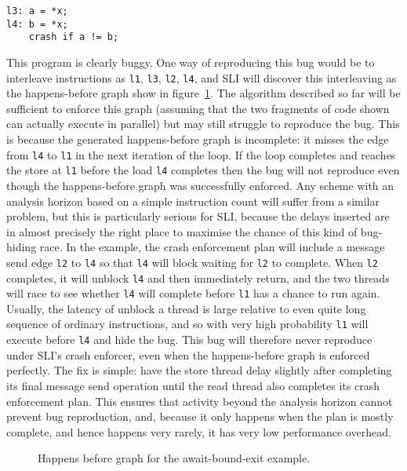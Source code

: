 \begin{verbatim}
l3: a = *x;
l4: b = *x;
    crash if a != b;
\end{verbatim}

This program is clearly buggy.  One way of reproducing this bug would
be to interleave instructions as \verb|l1|, \verb|l3|, \verb|l2|,
\verb|l4|, and SLI will discover this interleaving as the
happens-before graph show in figure~\ref{fig:enforce:await_exit_hb}.
The algorithm described so far will be sufficient to enforce this
graph (assuming that the two fragments of code shown can actually
execute in parallel) but may still struggle to reproduce the bug.
This is because the generated happens-before graph is incomplete: it
misses the edge from \verb|l4| to \verb|l1| in the next iteration of
the loop.  If the loop completes and reaches the store at \verb|l1|
before the load \verb|l4| completes then the bug will not reproduce
even though the happens-before graph was successfully enforced.  Any
scheme with an analysis horizon based on a simple instruction count
will suffer from a similar problem, but this is particularly serious
for SLI, because the delays inserted are in almost precisely the right
place to maximise the chance of this kind of bug-hiding race.  In the
example, the crash enforcement plan will include a message send edge
\verb|l2| to \verb|l4| so that \verb|l4| will block waiting for
\verb|l2| to complete.  When \verb|l2| completes, it will unblock
\verb|l4| and then immediately return, and the two threads will race
to see whether \verb|l4| will complete before \verb|l1| has a chance
to run again.  Usually, the latency of unblock a thread is large
relative to even quite long sequence of ordinary instructions, and so
with very high probability \verb|l1| will execute before \verb|l4| and
hide the bug.  This bug will therefore never reproduce under SLI's
crash enforcer, even when the happens-before graph is enforced
perfectly.  The fix is simple: have the store thread delay slightly
after completing its final message send operation until the read
thread also completes its crash enforcement plan.  This ensures that
activity beyond the analysis horizon cannot prevent bug reproduction,
and, because it only happens when the plan is mostly complete, and
hence happens very rarely, it has very low performance overhead.

\begin{figure}
\caption{Happens before graph for the await-bound-exit example.}
\label{fig:enforce:await_exit_hb}
\end{figure}

